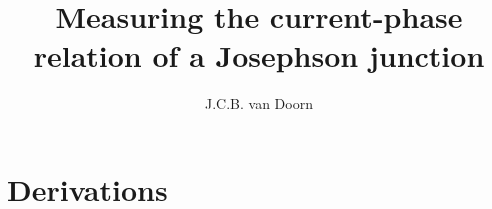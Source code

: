 \documentclass[twoside,single]{lion-msc}
\title{Measuring the current-phase relation of a Josephson junction}
\author{J.C.B. van Doorn}
\begin{document}
	\maketitle

	\tableofcontents

	
	
	
	
	
	

	\appendix
	\chapter{Derivations}
	
	

	\printbibliography
\end{document}

